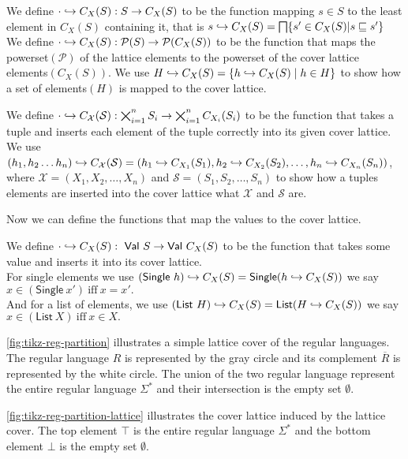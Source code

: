 \begin{definition}
    We define $\cdot \hookrightarrow C_X(S):S\rightarrow C_X(S)$ to be the function mapping $s\in S$ to the least element in $C_X(S)$ containing it, that is $s \into C_X(S)=\bigsqcap\{s'\in C_X(S)|s\sqsubseteq s'\}$
    \\

    We define $\cdot \hookrightarrow C_X(S):\mathcal{P}(S)\rightarrow \mathcal{P}(C_X(S))$ to be the function that maps the powerset$(\mathcal{P})$ of the lattice elements to the powerset of the cover lattice elements$(C_X (S))$.
    We use $H \hookrightarrow C_X (S) = \{h \hookrightarrow C_X (S) \mid h \in H\}$ to show how a set of elements$(H)$ is mapped to the cover lattice.
\end{definition}

\begin{definition}
    We define $\cdot \hookrightarrow C_\mathcal{X}(\mathcal{S}): \bigtimes_{i = 1}^{n} S_i \rightarrow \bigtimes_{i = 1}^{n} C_{X_i}(S_i)$ to be the function that takes a tuple and inserts each element of the tuple correctly into its given cover lattice.
    We use $(h_1, h_2 \dots h_n)\hookrightarrow C_{\mathcal{X}}(\mathcal{S})=(h_1 \hookrightarrow C_{X_1}(S_1), h_2\hookrightarrow C_{X_2}(S_2), \dots, h_n \hookrightarrow C_{X_n}(S_n))$, where $\mathcal{X}=(X_1, X_2, \dots, X_n)$ and $\mathcal{S}=(S_1, S_2, \dots, S_n)$ to show how a tuples elements are inserted into the cover lattice what $\mathcal{X}$ and $\mathcal{S}$ are.
\end{definition}

Now we can define the functions that map the values to the cover lattice.

\begin{definition}
    We define $\cdot \into C_X(S): \ \mathsf{Val} \ S \rightarrow \mathsf{Val} \ C_X(S)$ to be the function that takes some value and inserts it into its cover lattice. \\
    For single elements we use $(\mathsf{Single} \ h) \into C_X(S) = \mathsf{Single}(h\into C_X(S)) \\$
    we say $x \in (\mathsf{Single} \ x') \ \text{iff} \ x = x'.$ \\
    And for a list of elements, we use $(\mathsf{List} \ H) \hookrightarrow C_X(S)=\mathsf{List}(H\hookrightarrow C_X(S))\\$
    we say $x \in (\mathsf{List} \ X) \ \text{iff} \ x \in X.$
\end{definition}

\begin{example}
    \autoref{fig:tikz-reg-partition} illustrates a simple lattice cover of the regular languages.
    The regular language $R$ is represented by the gray circle and its complement $\overline{R}$ is represented by the white circle.
    The union of the two regular language represent the entire regular language $\Sigma^*$ and their intersection is the empty set $\emptyset$.

    \autoref{fig:tikz-reg-partition-lattice} illustrates the cover lattice induced by the lattice cover.
    The top element $\top$ is the entire regular language $\Sigma^*$ and the bottom element $\bot$ is the empty set $\emptyset$.
\end{example}

